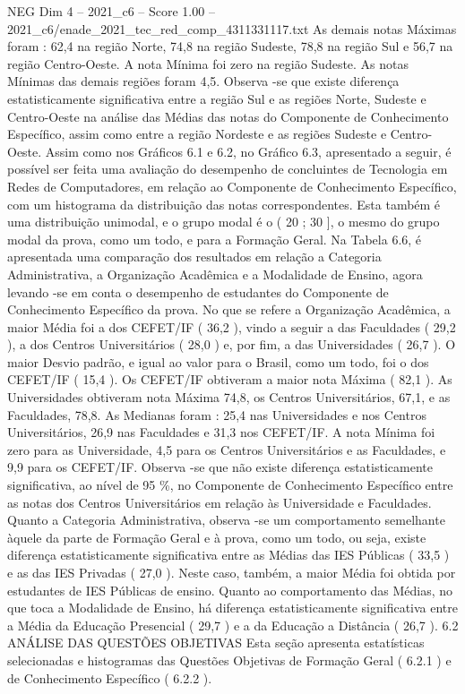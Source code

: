 \begin{textsample}{NEG Dim 4 – 2021\_c6 – Score 1.00 – 2021\_c6/enade\_2021\_tec\_red\_comp\_4311331117.txt}
As demais notas Máximas foram : 62,4 na região Norte, 74,8 na região Sudeste, 78,8 na região Sul e 56,7 na região Centro-Oeste.
A nota Mínima foi zero na região Sudeste.
As notas Mínimas das demais regiões foram 4,5.
Observa -se que existe diferença estatisticamente significativa entre a região Sul e as regiões Norte, Sudeste e Centro-Oeste na análise das Médias das notas do Componente de Conhecimento Específico, assim como entre a região Nordeste e as regiões Sudeste e Centro-Oeste.
Assim como nos Gráficos 6.1 e 6.2, no Gráfico 6.3, apresentado a seguir, é possível ser feita uma avaliação do desempenho de concluintes de Tecnologia em Redes de Computadores, em relação ao Componente de Conhecimento Específico, com um histograma da distribuição das notas correspondentes.
Esta também é uma distribuição unimodal, e o grupo modal é o ( 20 ; 30 ], o mesmo do grupo modal da prova, como um todo, e para a Formação Geral.
Na Tabela 6.6, é apresentada uma comparação dos resultados em relação a Categoria Administrativa, a Organização Acadêmica e a Modalidade de Ensino, agora levando -se em conta o desempenho de estudantes do Componente de Conhecimento Específico da prova.
No que se refere a Organização Acadêmica, a maior Média foi a dos CEFET/IF ( 36,2 ), vindo a seguir a das Faculdades ( 29,2 ), a dos Centros Universitários ( 28,0 ) e, por fim, a das Universidades ( 26,7 ).
O maior Desvio padrão, e igual ao valor para o Brasil, como um todo, foi o dos CEFET/IF ( 15,4 ).
Os CEFET/IF obtiveram a maior nota Máxima ( 82,1 ).
As Universidades obtiveram nota Máxima 74,8, os Centros Universitários, 67,1, e as Faculdades, 78,8.
As Medianas foram : 25,4 nas Universidades e nos Centros Universitários, 26,9 nas Faculdades e 31,3 nos CEFET/IF.
A nota Mínima foi zero para as Universidade, 4,5 para os Centros Universitários e as Faculdades, e 9,9 para os CEFET/IF.
Observa -se que não existe diferença estatisticamente significativa, ao nível de 95 \%, no Componente de Conhecimento Específico entre as notas dos Centros Universitários em relação às Universidade e Faculdades.
Quanto a Categoria Administrativa, observa -se um comportamento semelhante àquele da parte de Formação Geral e à prova, como um todo, ou seja, existe diferença estatisticamente significativa entre as Médias das IES Públicas ( 33,5 ) e as das IES Privadas ( 27,0 ).
Neste caso, também, a maior Média foi obtida por estudantes de IES Públicas de ensino.
Quanto ao comportamento das Médias, no que toca a Modalidade de Ensino, há diferença estatisticamente significativa entre a Média da Educação Presencial ( 29,7 ) e a da Educação a Distância ( 26,7 ). 6.2 ANÁLISE DAS QUESTÕES OBJETIVAS Esta seção apresenta estatísticas selecionadas e histogramas das Questões Objetivas de Formação Geral ( 6.2.1 ) e de Conhecimento Específico ( 6.2.2 ).

\end{textsample}
